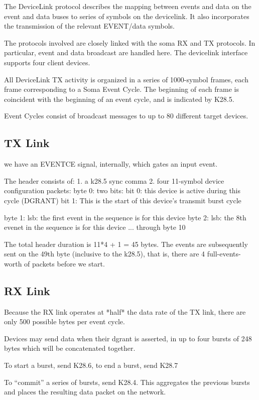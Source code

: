 
The DeviceLink protocol describes the mapping between events and
data on the event and data buses to series of symbols on the
devicelink. It also incorporates the transmission of the relevant
EVENT/data symbols.

The protocols involved are closely linked with the soma RX and TX
protocols. In particular, event and data broadcast are handled
here. The devicelink interface supports four client devices.

All DeviceLink TX activity is organized in a series of 1000-symbol
frames, each frame corresponding to a Soma Event Cycle. The beginning
of each frame is coincident with the beginning of an event cycle, and
is indicated by K28.5.

Event Cycles consist of broadcast messages to up to 80 different
target devices. 


\subsection{TX Link} 

we have an EVENTCE signal, internally, which gates an input event. 

The header consists of:
1. a k28.5 sync comma
2. four 11-symbol device configuration packets:
byte 0: two bits:
bit 0: this device is active during this cycle (DGRANT)
bit 1: This is the start of this device's transmit burst cycle

byte 1: lsb: the first event in the sequence is for this device
byte 2: lsb: the 8th evenet in the sequence is for this device
... through byte 10

The total header duration is 11*4 + 1 = 45 bytes. The events are
subsequently sent on the 49th byte (inclusive to the k28.5), that
is, there are 4 full-events-worth of packets before we start. 


\subsection{RX Link}

Because the RX link operates at *half* the data rate of the TX link,
there are only 500 possible bytes per event cycle.

Devices may send data when their dgrant is asserted, in up to four
bursts of 248 bytes which will be concatenated together. 

To start a burst, send K28.6, to end a burst, send K28.7

To ``commit'' a series of bursts, send K28.4. This aggregates the
previous bursts and places the resulting data packet on the network.



